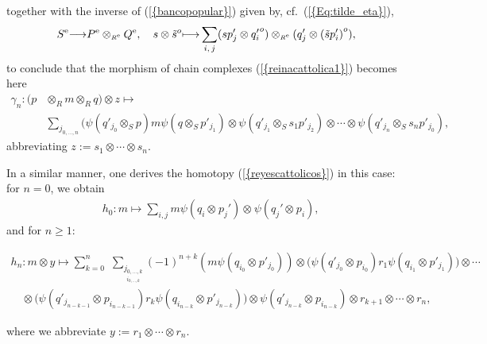 \documentclass[reqno, a4paper, 10pt]{amsart}
\numberwithin{equation}{section}
\theoremstyle{plain}
\theoremstyle{definition}
\theoremstyle{remark}
\begin{document}
together with the inverse of {{\rm (}\ref{{bancopopular}}{\rm )}} given by, cf.~{{\rm (}\ref{{Eq:tilde_eta}}{\rm )}},
$$
{{S^{\rm e}}} { \longrightarrow  } {{P^{\rm e}}} \otimes_{{\scriptscriptstyle{{R^{\rm e}}}}} {{Q^{\rm e}}}, \quad s \otimes {\tilde{{s}}}^o  { \longmapsto  } \sum_{i,\, j} (sp'_j \otimes {q'_i}^o) \otimes_{{\scriptscriptstyle{{R^{\rm e}}}}} (q'_j \otimes {({\tilde{{s}}}p'_i)}^o),
$$
to conclude that the morphism of chain complexes {{\rm (}\ref{{reinacattolica1}}{\rm )}} becomes here
\begin{equation*}
\begin{split}
\gamma_n: 
(p & \otimes_{{\scriptscriptstyle{R}}} m \otimes_{{\scriptscriptstyle{R}}} q) \otimes z \longmapsto \\
& \sum_{\scriptscriptstyle{j_{0, \ldots, n}}} 
  (\psi(q'_{j_0} \otimes_{{\scriptscriptstyle{S}}} p) m \psi(q \otimes_{{\scriptscriptstyle{S}}} p'_{j_1}) 
\otimes \psi(q'_{j_1} \otimes_{{\scriptscriptstyle{S}}} s_1 p'_{j_2}) 
\otimes \cdots \otimes \psi(q'_{j_n} \otimes_{{\scriptscriptstyle{S}}} s_n p'_{j_0}), 
\end{split}
\end{equation*}
abbreviating $z := s_1 \otimes \cdots \otimes s_n$. 

In a similar manner, one derives the homotopy {{\rm (}\ref{{reyescattolicos}}{\rm )}} in this case: for $n=0$, we obtain
\begin{equation*}
\begin{split}
& h_0:  m  \longmapsto \sum_{i,j} m \psi(q_i{\otimes_{\scriptscriptstyle{{}}}}p_j') {\otimes_{\scriptscriptstyle{{}}}}  \psi(q_j'{\otimes_{\scriptscriptstyle{{}}}}p_i) ,  
\end{split}
\end{equation*}
and for $n \geq 1$:
\begin{footnotesize}
\begin{multline*}
h_n: m \otimes y \longmapsto 
 \sum_{k=0}^{n}\,\,\underset{\underset{i_{0, \ldots,k}}{j_{0, \ldots, k}}}{\sum} (-1)^{n+k} 
(m \psi (q_{i_0}{\otimes_{\scriptscriptstyle{{}}}} p'_{j_0}) )   \otimes \Big( \psi(q'_{j_0}{\otimes_{\scriptscriptstyle{{}}}}p_{i_0})  r_1 \psi (q_{i_1}{\otimes_{\scriptscriptstyle{{}}}}p'_{j_1})  \Big) 
 \otimes \cdots \\ \quad \otimes  \Big( \psi(q'_{j_{n-k-1}}{\otimes_{\scriptscriptstyle{{}}}}p_{i_{n-k-1}})  r_k \psi (q_{i_{n-k}}{\otimes_{\scriptscriptstyle{{}}}} p'_{j_{n-k}}) \Big) 
  \otimes  \psi(q'_{j_{n-k}}{\otimes_{\scriptscriptstyle{{}}}} p_{i_{n-k}})   \otimes r_{k+1} \otimes \cdots \otimes r_n, 
\end{multline*}
\end{footnotesize}
where we abbreviate $y:=r_1
\otimes \cdots \otimes r_n$.
\end{document}
